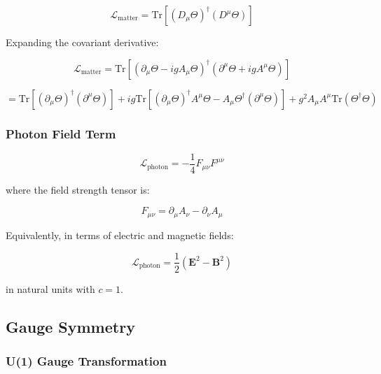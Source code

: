\begin{equation}
\label{eq:canonical:qed_matter}
\mathcal{L}_{\text{matter}} = \text{Tr}\left[(D_\mu\Theta)^\dagger (D^\mu\Theta)\right]
\end{equation}

Expanding the covariant derivative:

\begin{equation}
\mathcal{L}_{\text{matter}} = \text{Tr}\left[(\partial_\mu\Theta - ig A_\mu\Theta)^\dagger (\partial^\mu\Theta + ig A^\mu\Theta)\right]
\end{equation}

\begin{equation}
= \text{Tr}\left[(\partial_\mu\Theta)^\dagger (\partial^\mu\Theta)\right] + ig \text{Tr}\left[(\partial_\mu\Theta)^\dagger A^\mu\Theta - A_\mu\Theta^\dagger (\partial^\mu\Theta)\right] + g^2 A_\mu A^\mu \text{Tr}(\Theta^\dagger\Theta)
\end{equation}

\subsubsection{Photon Field Term}

\begin{equation}
\label{eq:canonical:qed_photon}
\mathcal{L}_{\text{photon}} = -\frac{1}{4} F_{\mu\nu} F^{\mu\nu}
\end{equation}

where the field strength tensor is:

\begin{equation}
F_{\mu\nu} = \partial_\mu A_\nu - \partial_\nu A_\mu
\end{equation}

Equivalently, in terms of electric and magnetic fields:

\begin{equation}
\mathcal{L}_{\text{photon}} = \frac{1}{2}(\mathbf{E}^2 - \mathbf{B}^2)
\end{equation}

in natural units with $c = 1$.

\subsection{Gauge Symmetry}

\subsubsection{U(1) Gauge Transformation}

